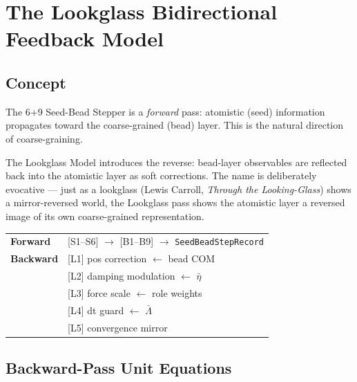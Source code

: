 \documentclass[11pt, a4paper, oneside]{article}
\theoremstyle{definition}
\begin{document}
\section{The Lookglass Bidirectional Feedback Model}
\label{sec:lookglass}

\subsection{Concept}

The 6+9 Seed-Bead Stepper is a \emph{forward} pass: atomistic (seed)
information propagates toward the coarse-grained (bead) layer.  This
is the natural direction of coarse-graining.

The Lookglass Model introduces the reverse: bead-layer observables
are reflected back into the atomistic layer as soft corrections.
The name is deliberately evocative — just as a lookglass
(Lewis Carroll, \textit{Through the Looking-Glass}) shows a mirror-reversed
world, the Lookglass pass shows the atomistic layer a reversed image of
its own coarse-grained representation.

\begin{tcolorbox}[
  colback=lgmint, colframe=green!40!black,
  title={Lookglass Architecture},
  fonttitle=\bfseries\small
]
\begin{center}
\begin{tabular}{ll}
\textbf{Forward}  & [S1--S6] $\to$ [B1--B9] $\to$ \texttt{SeedBeadStepRecord}\\[4pt]
\textbf{Backward} & [L1] pos correction $\leftarrow$ bead COM \\
                  & [L2] damping modulation $\leftarrow$ $\bar\eta$ \\
                  & [L3] force scale $\leftarrow$ role weights \\
                  & [L4] dt guard $\leftarrow$ $\bar\Lambda$ \\
                  & [L5] convergence mirror
\end{tabular}
\end{center}
\end{tcolorbox}

\subsection{Backward-Pass Unit Equations}
\end{document}
